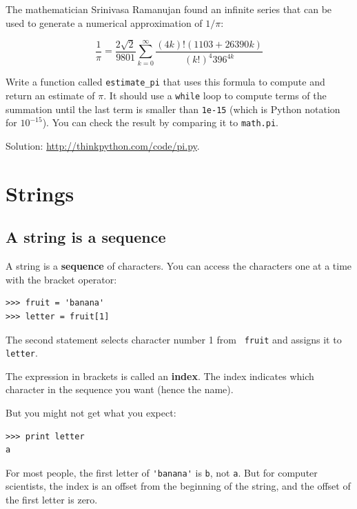\documentclass[10pt]{book}
\begin{document}
\begin{exercise}

The mathematician Srinivasa Ramanujan found an
infinite series
that can be used to generate a numerical
approximation of $1 / \pi$:

\[ \frac{1}{\pi} = \frac{2\sqrt{2}}{9801} 
\sum^\infty_{k=0} \frac{(4k)!(1103+26390k)}{(k!)^4 396^{4k}} \]

Write a function called \verb"estimate_pi" that uses this formula
to compute and return an estimate of $\pi$.  It should use a {\tt while}
loop to compute terms of the summation until the last term is
smaller than {\tt 1e-15} (which is Python notation for $10^{-15}$).
You can check the result by comparing it to {\tt math.pi}.

Solution: \url{http://thinkpython.com/code/pi.py}.

\end{exercise}


\chapter{Strings}
\label{strings}


\section{A string is a sequence}

A string is a {\bf sequence} of characters.  
You can access the characters one at a time with the
bracket operator:

\begin{verbatim}
>>> fruit = 'banana'
>>> letter = fruit[1]
\end{verbatim}
%
The second statement selects character number 1 from {\tt
fruit} and assigns it to {\tt letter}.  

The expression in brackets is called an {\bf index}.  
The index indicates which character in the sequence you
want (hence the name).

But you might not get what you expect:

\begin{verbatim}
>>> print letter
a
\end{verbatim}
%
For most people, the first letter of \verb"'banana'" is {\tt b}, not
{\tt a}.  But for computer scientists, the index is an offset from the
beginning of the string, and the offset of the first letter is zero.
\end{document}
